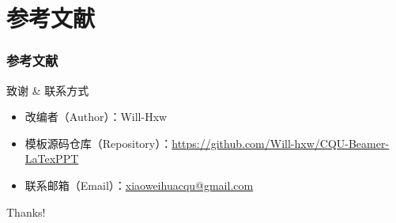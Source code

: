 \documentclass{beamer}  %
\begin{document}
\section{参考文献}

\begin{frame}[allowframebreaks]
  \frametitle{参考文献}
  
  \nocite{*}
  
\end{frame}

\begin{frame}{致谢 \& 联系方式}
  \begin{itemize}
    \item 改编者（Author）：Will-Hxw
    \item 模板源码仓库（Repository）：\url{https://github.com/Will-hxw/CQU-Beamer-LaTexPPT}
    \item 联系邮箱（Email）：\href{mailto:xiaoweihuacqu@gmail.com}{xiaoweihuacqu@gmail.com}
  \end{itemize}
  \vspace{1cm}
\end{frame}

\begin{frame}
    \begin{center}
        {\Huge\calligra Thanks!}
    \end{center}
\end{frame}
\end{document}
